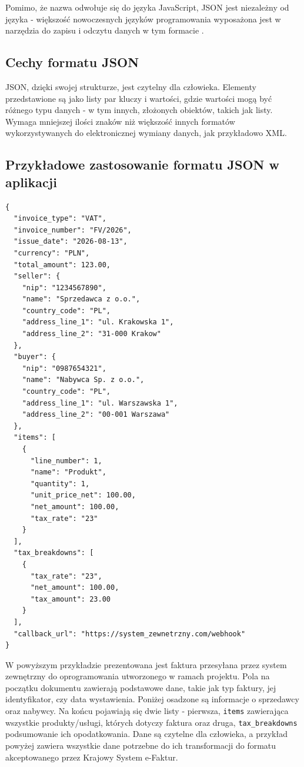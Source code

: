 Pomimo, że nazwa odwołuje się do języka JavaScript, JSON jest niezależny od języka - większość nowoczesnych języków programowania wyposażona jest w narzędzia do zapisu i odczytu danych w tym formacie \parencite{rfc8259}. 

\subsection{Cechy formatu JSON}
JSON, dzięki swojej strukturze, jest czytelny dla człowieka. Elementy przedstawione są jako listy par kluczy i wartości, gdzie wartości mogą być różnego typu danych - w tym innych, złożonych obiektów, takich jak listy. Wymaga mniejszej ilości znaków niż większość innych formatów wykorzystywanych do elektronicznej wymiany danych, jak przykładowo XML.

\subsection{Przykładowe zastosowanie formatu JSON w aplikacji}

\begin{lstlisting}[style=thesiscode, caption={Przykładowa faktura w formacie JSON odbierana od systemu zewnętrznego}, label={lst:json-invoice}]
{
  "invoice_type": "VAT",
  "invoice_number": "FV/2026",
  "issue_date": "2026-08-13",
  "currency": "PLN",
  "total_amount": 123.00,
  "seller": {
    "nip": "1234567890",
    "name": "Sprzedawca z o.o.",
    "country_code": "PL",
    "address_line_1": "ul. Krakowska 1",
    "address_line_2": "31-000 Krakow"
  },
  "buyer": {
    "nip": "0987654321",
    "name": "Nabywca Sp. z o.o.",
    "country_code": "PL",
    "address_line_1": "ul. Warszawska 1",
    "address_line_2": "00-001 Warszawa"
  },
  "items": [
    {
      "line_number": 1,
      "name": "Produkt",
      "quantity": 1,
      "unit_price_net": 100.00,
      "net_amount": 100.00,
      "tax_rate": "23"
    }
  ],
  "tax_breakdowns": [
    {
      "tax_rate": "23",
      "net_amount": 100.00,
      "tax_amount": 23.00
    }
  ],
  "callback_url": "https://system_zewnetrzny.com/webhook"
}
\end{lstlisting}

W powyższym przykładzie prezentowana jest faktura przesyłana przez system zewnętrzny do oprogramowania utworzonego w ramach projektu. Pola na początku dokumentu zawierają podstawowe dane, takie jak typ faktury, jej identyfikator, czy data wystawienia. Poniżej osadzone są informacje o sprzedawcy oraz nabywcy. Na końcu pojawiają się dwie listy - pierwsza, \texttt{items} zawierająca wszystkie produkty/usługi, których dotyczy faktura oraz druga, \texttt{tax\_breakdowns} podsumowanie ich opodatkowania. Dane są czytelne dla człowieka, a przykład powyżej zawiera wszystkie dane potrzebne do ich transformacji do formatu akceptowanego przez Krajowy System e-Faktur.

